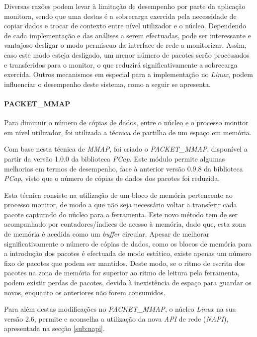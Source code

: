 Diversas razões podem levar à limitação de desempenho por parte da aplicação monitora, sendo que uma destas é a sobrecarga exercida pela necessidade de copiar dados e trocar de contexto entre nível utilizador e o núcleo.
Dependendo de cada implementação e das análises a serem efectuadas, pode ser interessante e vantajoso desligar o modo permiscuo da interface de rede a monitorizar.
Assim, caso este modo esteja desligado, um menor número de pacotes serão processados e transferidos para o monitor, o que reduzirá significativamente a sobrecarga exercida.
Outros mecanismos em especial para a implementação no \textit{Linux}, podem influenciar o desempenho deste sistema, como a seguir se apresenta.
 
\paragraph*{PACKET\_MMAP}

Para diminuir o número de cópias de dados, entre o núcleo e o processo monitor em nível utilizador, foi utilizada a técnica de partilha de um espaço em memória.

Com base nesta técnica de \textit{MMAP}, foi criado o \textit{PACKET\_MMAP}, disponível a partir da versão 1.0.0 da biblioteca \textit{PCap}.
Este módulo permite algumas melhorias em termos de desempenho, face à anterior versão 0.9.8 da biblioteca \textit{PCap}, visto que o número de cópias de dados dos pacotes foi reduzida.

Esta técnica consiste na utilização de um bloco de memória pertencente ao processo monitor, de modo a que não seja necessário voltar a transferir cada pacote capturado do núcleo para a ferramenta.
Este novo método tem de ser acompanhado por contadores/índices de acesso à memória, dado que, esta zona de memória é acedida como um \textit{buffer} circular.
Apesar de melhorar significativamente o número de cópias de dados, como os blocos de memória para a introdução dos pacotes é efectuada de modo estático, existe apenas um número fixo de pacotes que podem ser mantidos.
Deste modo, se o ritmo de escrita dos pacotes na zona de memória for superior ao ritmo de leitura pela ferramenta, podem existir perdas de pacotes, devido à inexistência de espaço para guardar os novos, enquanto os anteriores não forem consumidos.

Para além destas modificações no \textit{PACKET\_MMAP}, o núcleo \textit{Linux} na sua versão 2.6, permite e aconselha a utilização da nova \textit{API} de rede (\textit{NAPI}), apresentada na secção \ref{sub:napi}.


